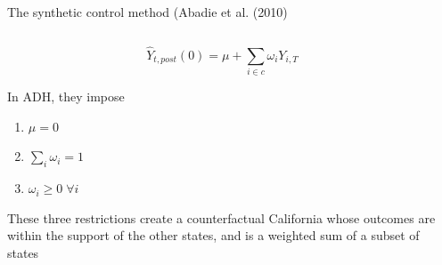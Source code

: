 \documentclass[notes,11pt, aspectratio=169]{beamer}
\newenvironment{wideitemize}{\itemize\addtolength{\itemsep}{10pt}}{\enditemize}
\begin{document}
\begin{frame}{The synthetic control method (Abadie et al. (2010)}
  \begin{columns}[T] %
    \begin{column}{0.8\textwidth}
  \begin{equation*}
    \hat{Y}_{t,post}(0) = \mu + \sum_{i \in c}\omega_{i} Y_{i, T}
  \end{equation*}
  \begin{wideitemize}
  \item In ADH, they impose
    \begin{enumerate}
    \item $\mu = 0$
    \item $\sum_{i} \omega_{i} = 1$
    \item $\omega_{i} \geq 0 \; \forall i$      
    \end{enumerate}
  \item These three restrictions create a counterfactual California
    whose outcomes are within the support of the other states, and
    is a weighted sum of a subset of states
  \end{wideitemize}
\end{column}
\begin{column}{0.4\textwidth}
\end{column}
\end{columns}
\end{frame}
\end{document}
